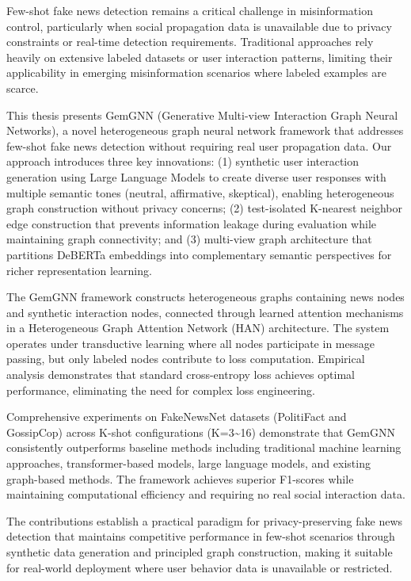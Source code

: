 \StartAbstract

Few-shot fake news detection remains a critical challenge in misinformation control, particularly when social propagation data is unavailable due to privacy constraints or real-time detection requirements. Traditional approaches rely heavily on extensive labeled datasets or user interaction patterns, limiting their applicability in emerging misinformation scenarios where labeled examples are scarce.

This thesis presents GemGNN (Generative Multi-view Interaction Graph Neural Networks), a novel heterogeneous graph neural network framework that addresses few-shot fake news detection without requiring real user propagation data. Our approach introduces three key innovations: (1) synthetic user interaction generation using Large Language Models to create diverse user responses with multiple semantic tones (neutral, affirmative, skeptical), enabling heterogeneous graph construction without privacy concerns; (2) test-isolated K-nearest neighbor edge construction that prevents information leakage during evaluation while maintaining graph connectivity; and (3) multi-view graph architecture that partitions DeBERTa embeddings into complementary semantic perspectives for richer representation learning.

The GemGNN framework constructs heterogeneous graphs containing news nodes and synthetic interaction nodes, connected through learned attention mechanisms in a Heterogeneous Graph Attention Network (HAN) architecture. The system operates under transductive learning where all nodes participate in message passing, but only labeled nodes contribute to loss computation. Empirical analysis demonstrates that standard cross-entropy loss achieves optimal performance, eliminating the need for complex loss engineering.

Comprehensive experiments on FakeNewsNet datasets (PolitiFact and GossipCop) across K-shot configurations (K=3\textasciitilde16) demonstrate that GemGNN consistently outperforms baseline methods including traditional machine learning approaches, transformer-based models, large language models, and existing graph-based methods. The framework achieves superior F1-scores while maintaining computational efficiency and requiring no real social interaction data.
 
The contributions establish a practical paradigm for privacy-preserving fake news detection that maintains competitive performance in few-shot scenarios through synthetic data generation and principled graph construction, making it suitable for real-world deployment where user behavior data is unavailable or restricted.

\EndAbstract
